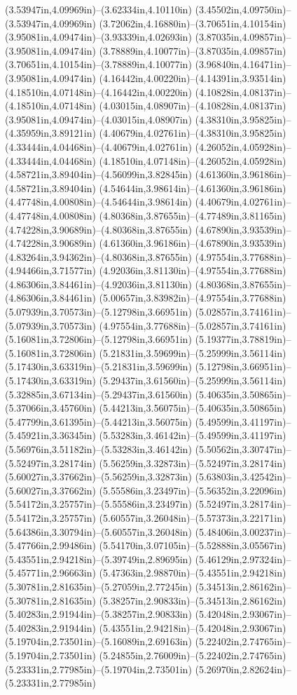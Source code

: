 (3.53947in,4.09969in)--(3.62334in,4.10110in) (3.45502in,4.09750in)--(3.53947in,4.09969in) (3.72062in,4.16880in)--(3.70651in,4.10154in) (3.95081in,4.09474in)--(3.93339in,4.02693in) (3.87035in,4.09857in)--(3.95081in,4.09474in) (3.78889in,4.10077in)--(3.87035in,4.09857in) (3.70651in,4.10154in)--(3.78889in,4.10077in) (3.96840in,4.16471in)--(3.95081in,4.09474in) (4.16442in,4.00220in)--(4.14391in,3.93514in) (4.18510in,4.07148in)--(4.16442in,4.00220in) (4.10828in,4.08137in)--(4.18510in,4.07148in) (4.03015in,4.08907in)--(4.10828in,4.08137in) (3.95081in,4.09474in)--(4.03015in,4.08907in) (4.38310in,3.95825in)--(4.35959in,3.89121in) (4.40679in,4.02761in)--(4.38310in,3.95825in) (4.33444in,4.04468in)--(4.40679in,4.02761in) (4.26052in,4.05928in)--(4.33444in,4.04468in) (4.18510in,4.07148in)--(4.26052in,4.05928in) (4.58721in,3.89404in)--(4.56099in,3.82845in) (4.61360in,3.96186in)--(4.58721in,3.89404in) (4.54644in,3.98614in)--(4.61360in,3.96186in) (4.47748in,4.00808in)--(4.54644in,3.98614in) (4.40679in,4.02761in)--(4.47748in,4.00808in) (4.80368in,3.87655in)--(4.77489in,3.81165in) (4.74228in,3.90689in)--(4.80368in,3.87655in) (4.67890in,3.93539in)--(4.74228in,3.90689in) (4.61360in,3.96186in)--(4.67890in,3.93539in) (4.83264in,3.94362in)--(4.80368in,3.87655in) (4.97554in,3.77688in)--(4.94466in,3.71577in) (4.92036in,3.81130in)--(4.97554in,3.77688in) (4.86306in,3.84461in)--(4.92036in,3.81130in) (4.80368in,3.87655in)--(4.86306in,3.84461in) (5.00657in,3.83982in)--(4.97554in,3.77688in) (5.07939in,3.70573in)--(5.12798in,3.66951in) (5.02857in,3.74161in)--(5.07939in,3.70573in) (4.97554in,3.77688in)--(5.02857in,3.74161in) (5.16081in,3.72806in)--(5.12798in,3.66951in) (5.19377in,3.78819in)--(5.16081in,3.72806in) (5.21831in,3.59699in)--(5.25999in,3.56114in) (5.17430in,3.63319in)--(5.21831in,3.59699in) (5.12798in,3.66951in)--(5.17430in,3.63319in) (5.29437in,3.61560in)--(5.25999in,3.56114in) (5.32885in,3.67134in)--(5.29437in,3.61560in) (5.40635in,3.50865in)--(5.37066in,3.45760in) (5.44213in,3.56075in)--(5.40635in,3.50865in) (5.47799in,3.61395in)--(5.44213in,3.56075in) (5.49599in,3.41197in)--(5.45921in,3.36345in) (5.53283in,3.46142in)--(5.49599in,3.41197in) (5.56976in,3.51182in)--(5.53283in,3.46142in) (5.50562in,3.30747in)--(5.52497in,3.28174in) (5.56259in,3.32873in)--(5.52497in,3.28174in) (5.60027in,3.37662in)--(5.56259in,3.32873in) (5.63803in,3.42542in)--(5.60027in,3.37662in) (5.55586in,3.23497in)--(5.56352in,3.22096in) (5.54172in,3.25757in)--(5.55586in,3.23497in) (5.52497in,3.28174in)--(5.54172in,3.25757in) (5.60557in,3.26048in)--(5.57373in,3.22171in) (5.64386in,3.30794in)--(5.60557in,3.26048in) (5.48406in,3.00237in)--(5.47766in,2.99486in) (5.54170in,3.07105in)--(5.52888in,3.05567in) (5.43551in,2.94218in)--(5.39749in,2.89695in) (5.46129in,2.97324in)--(5.45771in,2.96663in) (5.47363in,2.98870in)--(5.43551in,2.94218in) (5.30781in,2.81635in)--(5.27059in,2.77245in) (5.34513in,2.86162in)--(5.30781in,2.81635in) (5.38257in,2.90833in)--(5.34513in,2.86162in) (5.40283in,2.91944in)--(5.38257in,2.90833in) (5.42048in,2.93067in)--(5.40283in,2.91944in) (5.43551in,2.94218in)--(5.42048in,2.93067in) (5.19704in,2.73501in)--(5.16089in,2.69163in) (5.22402in,2.74765in)--(5.19704in,2.73501in) (5.24855in,2.76009in)--(5.22402in,2.74765in) (5.23331in,2.77985in)--(5.19704in,2.73501in) (5.26970in,2.82624in)--(5.23331in,2.77985in) 